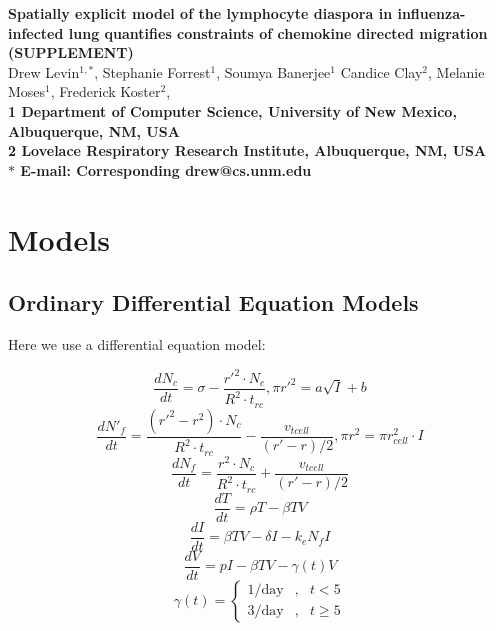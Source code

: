 \documentclass[10pt]{article}
\date{}
\begin{document}
\begin{flushleft}
{\Large
\textbf{Spatially explicit model of the lymphocyte diaspora in influenza-infected lung quantifies constraints of chemokine directed migration (SUPPLEMENT)}
}
\\
Drew Levin$^{1,\ast}$, 
Stephanie Forrest$^{1}$, 
Soumya Banerjee$^{1}$
Candice Clay$^{2}$, 
Melanie Moses$^{1}$, 
Frederick Koster$^{2}$, 
\\
\bf{1} Department of Computer Science, University of New Mexico, Albuquerque, NM, USA
\\
\bf{2} Lovelace Respiratory Research Institute, Albuquerque, NM, USA
\\
$\ast$ E-mail: Corresponding drew@cs.unm.edu
\end{flushleft}


\section*{Models}


\subsection*{Ordinary Differential Equation Models}
Here we use a differential equation model:

\begin{equation}
\frac{dN_{c}}{dt} = \sigma - \frac{r'^{2} \cdot N_{c}}{R^{2} \cdot t_{rc}} ,  \pi r'^{2} = a \sqrt{I} + b
\end{equation}
\begin{equation}
\frac{dN'_{f}}{dt} = \frac{(r'^{2} - r^{2}) \cdot N_{c}}{R^{2} \cdot t_{rc}} - \frac{v_{tcell}}{(r' - r) / 2} ,  \pi r^{2} = \pi r_{cell}^{2} \cdot I
\end{equation}
\begin{equation}
\frac{dN_{f}}{dt} = \frac{r^{2} \cdot N_{c}}{R^{2} \cdot t_{rc}} + \frac{v_{tcell}}{(r' - r) / 2}
\end{equation}
\begin{equation}
\label{tcl_eqn1}
\frac{dT}{dt} = \rho T -\beta TV
\end{equation}
\begin{equation}
\label{tcl_eqn2}
\frac{dI}{dt} = \beta TV - \delta I - k_{e} N_{f} I
\end{equation}
\begin{equation}
\label{tcl_eqn4}
\frac{dV}{dt} = pI - \beta TV - \gamma (t) V
\end{equation}
\begin{equation}
\label{is_eqn5}
\gamma (t) = \left\{ \begin{array}{rcl}
	1/\mbox{day} & \mbox{,}  & t < 5  \\
	3/\mbox{day} & \mbox{,} & t \geq 5  
	\end{array}\right.
\end{equation}
\end{document}
